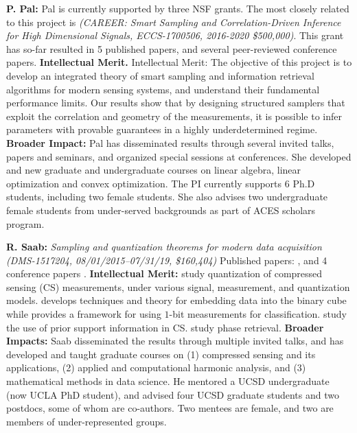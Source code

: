 

{\bf P. Pal:} Pal is currently supported by three NSF grants. The most closely related to this project is {\em  (CAREER: Smart Sampling and Correlation-Driven Inference for High Dimensional Signals, ECCS-1700506, 2016-2020 \$500,000)}. This grant has so-far resulted in 5 published papers, and several peer-reviewed conference papers. {\bf Intellectual Merit.} Intellectual Merit: The objective of this project is to develop an integrated theory of smart sampling and information retrieval algorithms for modern sensing systems, and understand their fundamental performance limits. Our results show that by designing structured samplers that exploit the correlation and geometry of the measurements, it is possible to infer parameters with provable guarantees in a highly underdetermined regime. {\bf Broader Impact:} Pal has disseminated results through several invited talks, papers and seminars, and organized special sessions at conferences. She developed and new graduate and undergraduate courses on linear algebra, linear optimization and convex optimization. The PI currently supports 6 Ph.D students, including two female students. She also advises two undergraduate female students from under-served backgrounds as part of ACES scholars program. 



{\bf R. Saab:} {\em Sampling and quantization theorems for modern data acquisition (DMS-1517204, 08/01/2015--07/31/19,
\$160,404)}
Published papers: \cite{knudson2016one, mansour2017recovery, needell2017weighted, SaabIEEEIT, needell2018simple, LybrandSaab2018, iwen2018phase, huynh2018fast, feng2019quantized}, and 4 conference papers \cite{needell2017simple, feng2017quantized, iwen2018phase, iwen2019new}.  {\bf Intellectual Merit:}  \cite{knudson2016one, SaabIEEEIT, feng2019quantized, LybrandSaab2018, iwen2019new} study quantization of compressed sensing (CS) measurements, under various signal, measurement, and quantization models. \cite{huynh2018fast} develops techniques and theory for embedding data into the binary cube while  \cite{needell2018simple} provides a framework for using $1$-bit  measurements for classification. \cite{mansour2017recovery, needell2017weighted} study  the use of prior support information  in CS. \cite{iwen2018phase, iwen2017phase} study phase retrieval. %
{\bf Broader Impacts: }  Saab disseminated the results through multiple invited talks, and has developed and taught graduate courses on (1) compressed sensing and its applications, (2) applied and computational harmonic analysis, and (3) mathematical methods in data science. He mentored a UCSD undergraduate (now UCLA PhD student), and advised four UCSD graduate students and two postdocs,  some of whom are co-authors. Two  mentees are female, and two are members of under-represented groups.%

